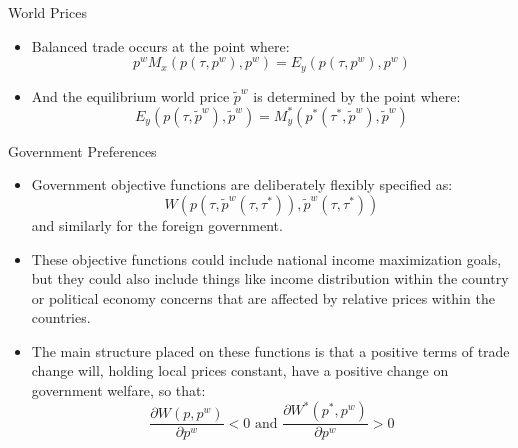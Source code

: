 \documentclass[aspectratio=169]{beamer}
\begin{document}
\begin{frame}{World Prices}

\begin{itemize}
    \item<1-> Balanced trade occurs at the point where:
    \begin{equation*}
        p^{w} M_{x}\left( p\left( \tau, p^{w} \right), p^{w} \right) = E_{y}\left( p\left( \tau, p^{w} \right), p^{w} \right)
    \end{equation*}
    \item<2-> And the equilibrium world price $ \tilde{p}^{w} $ is determined by the point where:
    \begin{equation*}
        E_{y}\left( p\left( \tau, \tilde{p}^{w} \right), \tilde{p}^{w} \right) = M_{y}^{*}\left( p^{*}\left( \tau^{*}, \tilde{p}^{w} \right), \tilde{p}^{w} \right)
    \end{equation*}
\end{itemize}
    
\end{frame}


\begin{frame}{Government Preferences}

\begin{itemize}
    \item<1-> Government objective functions are deliberately flexibly specified as:
    \begin{equation*}
        W\left( p\left( \tau, \tilde{p}^{w}\left( \tau, \tau^{*} \right) \right), \tilde{p}^{w}\left( \tau, \tau^{*} \right) \right)
    \end{equation*}
    and similarly for the foreign government.
    \item<2-> These objective functions could include national income maximization goals, but they could also include things like income distribution within the country or political economy concerns that are affected by relative prices within the countries.
    \item<3-> The main structure placed on these functions is that a positive terms of trade change will, holding local prices constant, have a positive change on government welfare, so that:
    \begin{equation*}
        \frac{\partial W\left( p, p^{w} \right)}{\partial p^{w}} < 0 \text{ and } \frac{\partial W^{*}\left( p^{*}, p^{w} \right)}{\partial p^{w}} > 0
    \end{equation*}
\end{itemize}
    
\end{frame}
\end{document}
